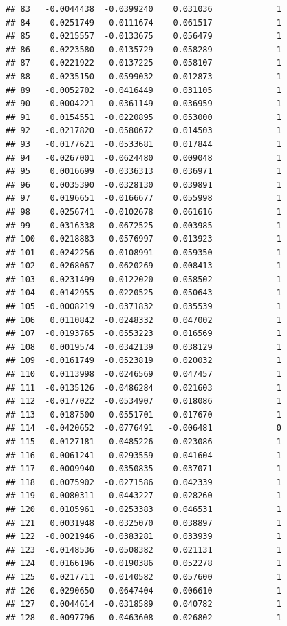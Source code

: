 \documentclass[12pt]{article}\usepackage[]{graphicx}\usepackage[]{xcolor}
\makeatletter
\newenvironment{kframe}{%
 \def\at@end@of@kframe{}%
 \ifinner\ifhmode%
  \def\at@end@of@kframe{\end{minipage}}%
  \begin{minipage}{\columnwidth}%
 \fi\fi%
 \def\FrameCommand##1{\hskip\@totalleftmargin \hskip-\fboxsep
 \colorbox{shadecolor}{##1}\hskip-\fboxsep
     \hskip-\linewidth \hskip-\@totalleftmargin \hskip\columnwidth}%
 \MakeFramed {\advance\hsize-\width
   \@totalleftmargin\z@ \linewidth\hsize
   \@setminipage}}%
 {\par\unskip\endMakeFramed%
 \at@end@of@kframe}
\newenvironment{knitrout}{}{} %
\makeatother
\begin{document}
\begin{knitrout}
\begin{kframe}
\begin{verbatim}
## 83   -0.0044438  -0.0399240    0.031036             1
## 84    0.0251749  -0.0111674    0.061517             1
## 85    0.0215557  -0.0133675    0.056479             1
## 86    0.0223580  -0.0135729    0.058289             1
## 87    0.0221922  -0.0137225    0.058107             1
## 88   -0.0235150  -0.0599032    0.012873             1
## 89   -0.0052702  -0.0416449    0.031105             1
## 90    0.0004221  -0.0361149    0.036959             1
## 91    0.0154551  -0.0220895    0.053000             1
## 92   -0.0217820  -0.0580672    0.014503             1
## 93   -0.0177621  -0.0533681    0.017844             1
## 94   -0.0267001  -0.0624480    0.009048             1
## 95    0.0016699  -0.0336313    0.036971             1
## 96    0.0035390  -0.0328130    0.039891             1
## 97    0.0196651  -0.0166677    0.055998             1
## 98    0.0256741  -0.0102678    0.061616             1
## 99   -0.0316338  -0.0672525    0.003985             1
## 100  -0.0218883  -0.0576997    0.013923             1
## 101   0.0242256  -0.0108991    0.059350             1
## 102  -0.0268067  -0.0620269    0.008413             1
## 103   0.0231499  -0.0122020    0.058502             1
## 104   0.0142955  -0.0220525    0.050643             1
## 105  -0.0008219  -0.0371832    0.035539             1
## 106   0.0110842  -0.0248332    0.047002             1
## 107  -0.0193765  -0.0553223    0.016569             1
## 108   0.0019574  -0.0342139    0.038129             1
## 109  -0.0161749  -0.0523819    0.020032             1
## 110   0.0113998  -0.0246569    0.047457             1
## 111  -0.0135126  -0.0486284    0.021603             1
## 112  -0.0177022  -0.0534907    0.018086             1
## 113  -0.0187500  -0.0551701    0.017670             1
## 114  -0.0420652  -0.0776491   -0.006481             0
## 115  -0.0127181  -0.0485226    0.023086             1
## 116   0.0061241  -0.0293559    0.041604             1
## 117   0.0009940  -0.0350835    0.037071             1
## 118   0.0075902  -0.0271586    0.042339             1
## 119  -0.0080311  -0.0443227    0.028260             1
## 120   0.0105961  -0.0253383    0.046531             1
## 121   0.0031948  -0.0325070    0.038897             1
## 122  -0.0021946  -0.0383281    0.033939             1
## 123  -0.0148536  -0.0508382    0.021131             1
## 124   0.0166196  -0.0190386    0.052278             1
## 125   0.0217711  -0.0140582    0.057600             1
## 126  -0.0290650  -0.0647404    0.006610             1
## 127   0.0044614  -0.0318589    0.040782             1
## 128  -0.0097796  -0.0463608    0.026802             1

\end{verbatim}
\end{kframe}
\end{knitrout}
\end{document}
